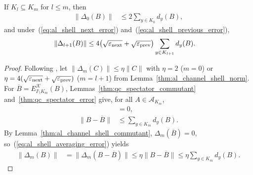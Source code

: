 \begin{lemma}
    \label{thm:al_channel_shell_oscillation}
    \leanok
    If $K_l\subseteq K_m$ for $l\le m$, then
    \begin{align}
        \|\Delta_0(B)\| & \le2\sum_{y\in K_0}d_y(B),
        \label{eq:al_shell_zero_oscillation}
    \end{align}
    and under~(\ref{eq:al_shell_next_error})
    and~(\ref{eq:al_shell_previous_error}),
    \begin{align}
        \|\Delta_{l+1}(B)\|
         & \le4\bigl(\sqrt{\varepsilon_{\rm next}}
        +\sqrt{\varepsilon_{\rm prev}}\bigr)
        \sum_{y\in K_{l+1}}d_y(B).
        \label{eq:al_shell_successor_oscillation}
    \end{align}
\end{lemma}
\begin{proof}
    \leanok
    Following \cite[Section~10]{OpenAI2026AreaLaw}, let
    $\|\Delta_m(C)\|\le\eta\|C\|$ with $\eta=2$ ($m=0$) or
    $\eta=4(\sqrt{\varepsilon_{\rm next}}+\sqrt{\varepsilon_{\rm prev}})$
    ($m=l+1$) from Lemma~\ref{thm:al_channel_shell_norm}. For
    $\overline B=E_{I\setminus K_m}^{\mathcal K}(B)$,
    Lemmas~\ref{thm:qc_spectator_commutant} and~\ref{thm:qc_spectator_error}
    give, for all $A\in\mathcal A_{K_m}$,
    \begin{align}
        [\overline B,\widehat A] & =0,
        \label{eq:al_shell_averaged_commutant}               \\
        \|B-\overline B\|        & \le\sum_{y\in K_m}d_y(B).
        \label{eq:al_shell_averaging_error}
    \end{align}
    By Lemma~\ref{thm:al_channel_shell_commutant}, $\Delta_m(\overline B)=0$,
    so~(\ref{eq:al_shell_averaging_error}) yields
    \begin{align}
        \|\Delta_m(B)\|
         & =\|\Delta_m(B-\overline B)\|
        \le\eta\|B-\overline B\|
        \le\eta\sum_{y\in K_m}d_y(B).
        \label{eq:al_shell_oscillation_bound}
    \end{align}
\end{proof}
